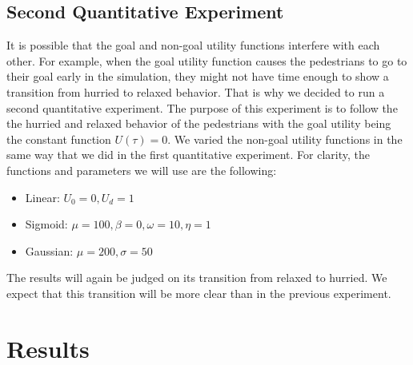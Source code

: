 \documentclass[11pt, a4paper]{book}
\begin{document}
\begin{minipage}{\textwidth}
\section{Second Quantitative Experiment}
\label{sec:quantitativeexp2}
It is possible that the goal and non-goal utility functions interfere with each other. For example, when the goal utility function causes the pedestrians to go to their goal early in the simulation, they might not have time enough to show a transition from hurried to relaxed behavior. That is why we decided to run a second quantitative experiment. The purpose of this experiment is to follow the the hurried and relaxed behavior of the pedestrians with the goal utility being the constant function $U(\tau)=0$. We varied the non-goal utility functions in the same way that we did in the first quantitative experiment. For clarity, the functions and parameters we will use are the following:
\begin{itemize}
\item Linear: $U_0=0, U_d=1$
\item Sigmoid: $\mu=100, \beta=0, \omega=10, \eta=1$
\item Gaussian: $\mu=200, \sigma=50$
\end{itemize}

The results will again be judged on its transition from relaxed to hurried. We expect that this transition will be more clear than in the previous experiment.
\end{minipage}

\chapter{Results}
\label{chap:results}
\end{document}
